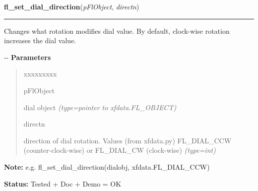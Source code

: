 \hspace{.8\funcindent}\begin{boxedminipage}{\funcwidth}

    \raggedright \textbf{fl\_set\_dial\_direction}(\textit{pFlObject}, \textit{directn})

    \vspace{-1.5ex}

    \rule{\textwidth}{0.5\fboxrule}
\setlength{\parskip}{2ex}

Changes what rotation modifies dial value. By default, clock-wise
rotation increases the dial value.

-{}-
\setlength{\parskip}{1ex}
      \textbf{Parameters}
      \vspace{-1ex}

      \begin{quote}
        \begin{Ventry}{xxxxxxxxx}

          \item[pFlObject]


dial object
            {\it (type=pointer to xfdata.FL\_OBJECT)}

          \item[directn]


direction of dial rotation. Values (from xfdata.py) FL\_DIAL\_CCW
(counter-clock-wise) or FL\_DIAL\_CW (clock-wise)
            {\it (type=int)}

        \end{Ventry}

      \end{quote}

\textbf{Note:} 
e.g. fl\_set\_dial\_direction(dialobj, xfdata.FL\_DIAL\_CCW)


\textbf{Status:} 
Tested + Doc + Demo = OK


    \end{boxedminipage}

